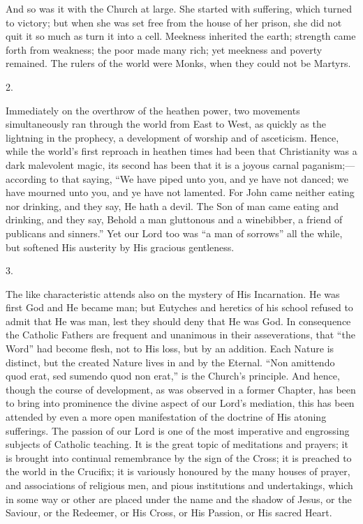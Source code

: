 And so was it with the Church at large. She started with suffering,
which turned to victory; but when she was set free from the house of
her prison, she did not quit it so much as turn it into a cell.
Meekness inherited the earth; strength came forth from weakness; the
poor made many rich; yet meekness and poverty remained. The rulers of
the world were Monks, when they could not be Martyrs.

2.

Immediately on the overthrow of the heathen power, two movements
simultaneously ran through the world from East to West, as quickly as
the lightning in the prophecy, a development of worship and of
asceticism. Hence, while the world's first reproach in heathen times
had been that Christianity was a dark malevolent magic, its second has
been that it is a joyous carnal paganism;—according to that saying,
``We have piped unto you, and ye have not danced; we have mourned
unto you, and ye have not lamented. For John came neither eating nor
drinking, and they say, He hath a devil. The Son of man came eating
and drinking, and they say, Behold a man gluttonous and a winebibber,
a friend of publicans and sinners.'' Yet our Lord too was ``a
man of sorrows'' all the while, but softened His austerity by His
gracious gentleness.

3.

The like characteristic attends also on the mystery of His
Incarnation. He was first God and He became man; but Eutyches and
heretics of his school refused to admit that He was man, lest they
should deny that He was God. In consequence the Catholic Fathers are
frequent and unanimous in their asseverations, that ``the
Word'' had become flesh, not to His loss, but by an addition. Each
Nature is distinct, but the created Nature lives in and by the
Eternal. ``Non amittendo quod erat, sed sumendo quod non erat,''
is the Church's principle. And hence, though the course of
development, as was observed in a former Chapter, has been to bring
into prominence the divine aspect of our Lord's mediation, this has
been attended by even a more open manifestation of the doctrine of His
atoning sufferings. The passion of our Lord is one of the most
imperative and engrossing subjects of Catholic teaching. It is the
great topic of meditations and prayers; it is brought into continual
remembrance by the sign of the Cross; it is preached to the world in
the Crucifix; it is variously honoured by the many houses of prayer,
and associations of religious men, and pious institutions and
undertakings, which in some way or other are placed under the name and
the shadow of Jesus, or the Saviour, or the Redeemer, or His Cross, or
His Passion, or His sacred Heart.

